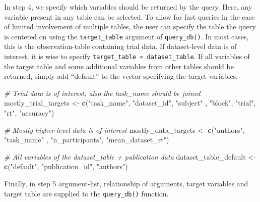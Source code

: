 \documentclass[
  man,floatsintext]{apa6}
\newenvironment{Shaded}{\begin{snugshade}}{\end{snugshade}}
\newcommand{\CommentTok}[1]{\textcolor[rgb]{0.56,0.35,0.01}{\textit{#1}}}
\newcommand{\FunctionTok}[1]{\textcolor[rgb]{0.13,0.29,0.53}{\textbf{#1}}}
\newcommand{\NormalTok}[1]{#1}
\newcommand{\OtherTok}[1]{\textcolor[rgb]{0.56,0.35,0.01}{#1}}
\newcommand{\StringTok}[1]{\textcolor[rgb]{0.31,0.60,0.02}{#1}}
\begin{document}
In step 4, we specify which variables should be returned by the query. Here, any variable present in any table can be selected. To allow for fast queries in the case of limited involvement of multiple tables, the user can specify the table the query is centered on using the \texttt{target\_table} argument of \texttt{query\_db()}. In most cases, this is the observation-table containing trial data. If dataset-level data is of interest, it is wise to specify \texttt{target\_table\ =\ dataset\_table}. If all variables of the target table and some additional variables from other tables should be returned, simply add ``default'' to the vector specifying the target variables.

\begin{Shaded}
\begin{Highlighting}[]
\CommentTok{\# Trial data is of interest, also the task\_name should be joined}
\NormalTok{mostly\_trial\_targets }\OtherTok{\textless{}{-}} \FunctionTok{c}\NormalTok{(}\StringTok{"task\_name"}\NormalTok{, }\StringTok{"dataset\_id"}\NormalTok{, }\StringTok{"subject"}
\NormalTok{                          , }\StringTok{"block"}\NormalTok{, }\StringTok{"trial"}\NormalTok{, }\StringTok{"rt"}\NormalTok{, }\StringTok{"accuracy"}\NormalTok{)}

\CommentTok{\# Mostly higher{-}level data is of interest}
\NormalTok{mostly\_data\_targets }\OtherTok{\textless{}{-}} \FunctionTok{c}\NormalTok{(}\StringTok{"authors"}\NormalTok{, }\StringTok{"task\_name"}
\NormalTok{                         , }\StringTok{"n\_participants"}\NormalTok{, }\StringTok{"mean\_dataset\_rt"}\NormalTok{)}

\CommentTok{\# All variables of the dataset\_table + publication data}
\NormalTok{dataset\_table\_default }\OtherTok{\textless{}{-}} \FunctionTok{c}\NormalTok{(}\StringTok{"default"}\NormalTok{, }\StringTok{"publication\_id"}\NormalTok{, }\StringTok{"authors"}\NormalTok{)}
\end{Highlighting}
\end{Shaded}

Finally, in step 5 argument-list, relationship of arguments, target variables and target table are supplied to the \texttt{query\_db()} function.
\end{document}
